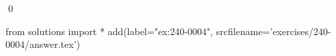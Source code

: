 
\begin{ex} 
  \label{ex:240-0004}
  
  \qed
\end{ex} 
\begin{python0}
from solutions import *
add(label="ex:240-0004",
    srcfilename='exercises/240-0004/answer.tex') 
\end{python0}
